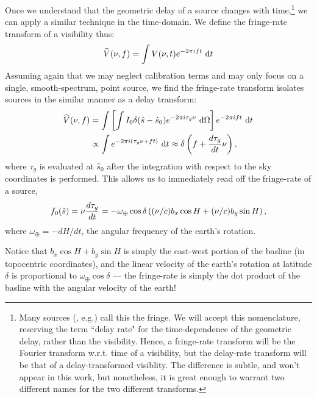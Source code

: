 Once we understand that the geometric delay of a source changes with time,\footnote{Many sources
(\cite{TMS}, e.g.) call this the fringe. We will accept this nomenclature, reserving the term
``delay rate" for the time-dependence of the geometric delay, rather than the visibility. Hence, a
fringe-rate transform will be the Fourier transform w.r.t. time of a visibility, but the delay-rate
transform will be that of a delay-transformed visiblity. The difference is subtle, and won't appear
in this work, but nonetheless, it is great enough to warrant two different names for the two
different transforms.} we can apply a similar technique in the time-domain. We
define the fringe-rate transform of a visibility thus:
\begin{equation}
  \widehat{V}(\nu,f) = \int V(\nu,t) e^{-2\pi i ft}\ \mathrm{d}t
  \label{eq:def_DR}
\end{equation}
Assuming again that we may neglect calibration terms and may only focus on a single,
smooth-spectrum, point source, we find the fringe-rate transform isolates sources in the similar manner
as a delay transform:
\begin{align}
  \widehat{V}(\nu,f) &= 
  \int \left[\int I_0\delta(\hat{s}-\hat{s}_0)e^{-2\pi i \tau_g\nu}\ \mathrm{d}\Omega\right]e^{-2\pi i ft}\ \mathrm{d}t
  \nonumber \\
  &\propto \int e^{-2\pi i(\tau_g\nu + ft)}\ \mathrm{d}t
  \approx \delta\left(f+\frac{d \tau_g}{d t}\nu\right),
  \label{eq:prep_fringe_rate}
\end{align}
where $\tau_g$ is evaluated at $\hat{s}_0$ after the integration with respect to the sky coordinates
is performed. This allows us to immediately read off the fringe-rate of a source,
\begin{equation}
  f_0(\hat{s}) = \nu\frac{d \tau_g}{d t} = 
  -\omega_\oplus\cos\delta\left((\nu/c)b_x\cos H + (\nu/c)b_y\sin H\right),
  \label{eq:def_fringe_rate}
\end{equation}
where $\omega_\oplus = -dH/dt$, the angular frequency of the earth's rotation.

Notice that $b_x\cos H + b_y \sin H$ is simply the east-west portion of the
basline (in topocentric coordinates), and the linear velocity of the earth's rotation at latitude
$\delta$ is proportional to $\omega_\oplus\cos\delta$ --- the fringe-rate is simply the dot product
of the basline with the angular velocity of the earth!

